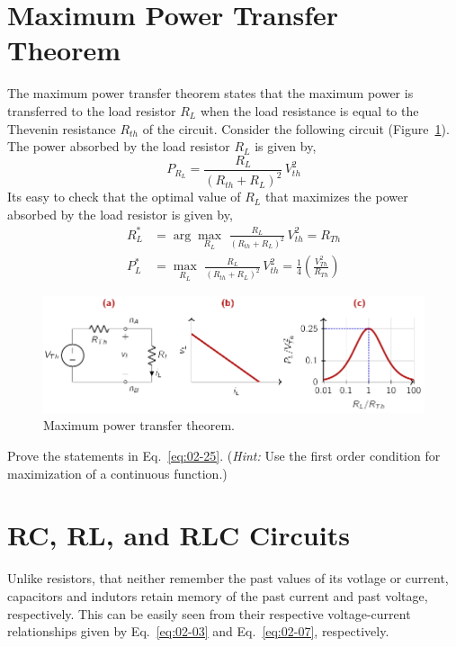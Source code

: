 \section{Maximum Power Transfer Theorem}
The maximum power transfer theorem states that the maximum power is transferred to the load resistor $R_L$ when the load resistance is equal to the Thevenin resistance $R_{th}$ of the circuit. Consider the following circuit (Figure~\ref{fig:02-06}). The power absorbed by the load resistor $R_L$ is given by,
\begin{equation}
    P_{R_L} = \frac{R_L}{(R_{th} + R_L)^2} \, V_{th}^2
    \label{eq:02-24}
\end{equation}
Its easy to check that the optimal value of $R_L$ that maximizes the power absorbed by the load resistor is given by,
\begin{equation}
    \begin{split}
        R_L^* &= \arg\max_{R_L} \,\, \frac{R_L}{(R_{th} + R_L)^2} \, V_{th}^2 = R_{Th} \\
        P_L^* &= \max_{R_L} \,\, \frac{R_L}{(R_{th} + R_L)^2} \, V_{th}^2 = \frac{1}{4}\left(\frac{V_{Th}^2}{R_{Th}}\right)
    \end{split}
    \label{eq:02-25}
\end{equation}

\begin{figure}[t]
    \centering
    \includegraphics[width=\textwidth]{figure/ch02/fig02-06.pdf}
    \caption{Maximum power transfer theorem.}
    \label{fig:02-06}
\end{figure}

\begin{boxedstuff}
    \begin{problem}
        Prove the statements in Eq.~\ref{eq:02-25}. (\textit{Hint:} Use the first order condition for maximization of a continuous function.)
    \end{problem}
\end{boxedstuff}

\section{RC, RL, and RLC Circuits}
Unlike resistors, that neither remember the past values of its votlage or current, capacitors and indutors retain memory of the past current and past voltage, respectively. This can be easily seen from their respective voltage-current relationships given by Eq.~\ref{eq:02-03} and Eq.~\ref{eq:02-07}, respectively. 

